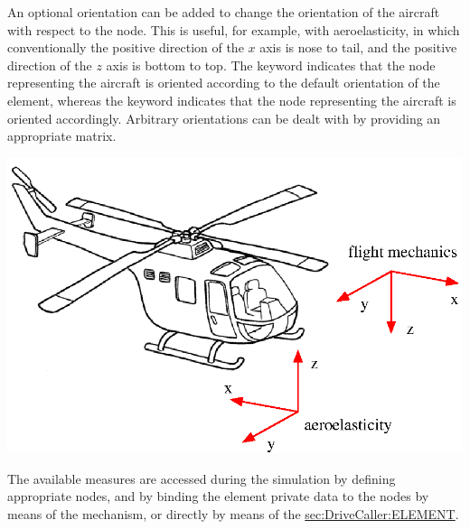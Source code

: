 An optional orientation can be added to change the orientation 
of the aircraft with respect to the node.
This is useful, for example, with aeroelasticity, in which conventionally
the positive direction of the $x$ axis is nose to tail,
and the positive direction of the $z$ axis is bottom to top.
The keyword  indicates that the node representing
the aircraft is oriented according to the default orientation
of the element, whereas the keyword 
indicates that the node representing the aircraft is oriented accordingly.
Arbitrary orientations can be dealt with by providing an appropriate
 matrix.

\begin{center}
\includegraphics[width=.5\textwidth]{elicottero}
\end{center}

The available measures are accessed during the simulation 
by defining appropriate  nodes, and by binding
the  element private data to the nodes 
by means of the  mechanism, or directly by means
of the 
\hyperref{\kw{element} drive}{\kw{element} drive (see Section~}{)}{sec:DriveCaller:ELEMENT}.

